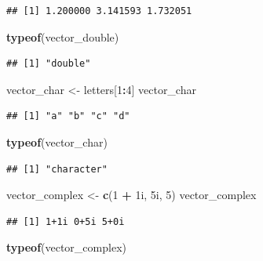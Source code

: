 \documentclass[]{book}
\newenvironment{Shaded}{\begin{snugshade}}{\end{snugshade}}
\newcommand{\KeywordTok}[1]{\textcolor[rgb]{0.13,0.29,0.53}{\textbf{#1}}}
\newcommand{\DecValTok}[1]{\textcolor[rgb]{0.00,0.00,0.81}{#1}}
\newcommand{\StringTok}[1]{\textcolor[rgb]{0.31,0.60,0.02}{#1}}
\newcommand{\OperatorTok}[1]{\textcolor[rgb]{0.81,0.36,0.00}{\textbf{#1}}}
\newcommand{\NormalTok}[1]{#1}
\theoremstyle{definition}
\theoremstyle{definition}
\theoremstyle{definition}
\theoremstyle{remark}
\begin{document}
\begin{verbatim}
## [1] 1.200000 3.141593 1.732051
\end{verbatim}

\begin{Shaded}
\begin{Highlighting}[]
\KeywordTok{typeof}\NormalTok{(vector_double)}
\end{Highlighting}
\end{Shaded}

\begin{verbatim}
## [1] "double"
\end{verbatim}

\begin{Shaded}
\begin{Highlighting}[]
\NormalTok{vector_char <-}\StringTok{ }\NormalTok{letters[}\DecValTok{1}\OperatorTok{:}\DecValTok{4}\NormalTok{]}
\NormalTok{vector_char}
\end{Highlighting}
\end{Shaded}

\begin{verbatim}
## [1] "a" "b" "c" "d"
\end{verbatim}

\begin{Shaded}
\begin{Highlighting}[]
\KeywordTok{typeof}\NormalTok{(vector_char)}
\end{Highlighting}
\end{Shaded}

\begin{verbatim}
## [1] "character"
\end{verbatim}

\begin{Shaded}
\begin{Highlighting}[]
\NormalTok{vector_complex <-}\StringTok{ }\KeywordTok{c}\NormalTok{(}\DecValTok{1} \OperatorTok{+}\StringTok{ }\NormalTok{1i, 5i, }\DecValTok{5}\NormalTok{)}
\NormalTok{vector_complex}
\end{Highlighting}
\end{Shaded}

\begin{verbatim}
## [1] 1+1i 0+5i 5+0i
\end{verbatim}

\begin{Shaded}
\begin{Highlighting}[]
\KeywordTok{typeof}\NormalTok{(vector_complex)}
\end{Highlighting}
\end{Shaded}
\end{document}
